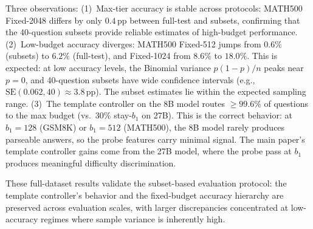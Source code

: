 Three observations:
(1)~Max-tier accuracy is stable across protocols: MATH500 Fixed-2048 differs by only $0.4$\,pp between full-test and subsets, confirming that the 40-question subsets provide reliable estimates of high-budget performance.
(2)~Low-budget accuracy diverges: MATH500 Fixed-512 jumps from $0.6\%$ (subsets) to $6.2\%$ (full-test), and Fixed-1024 from $8.6\%$ to $18.0\%$.
This is expected: at low accuracy levels, the Binomial variance $p(1{-}p)/n$ peaks near $p{=}0$, and 40-question subsets have wide confidence intervals (e.g., $\text{SE}(0.062, 40) \approx 3.8$\,pp).
The subset estimates lie within the expected sampling range.
(3)~The template controller on the 8B model routes $\geq\!99.6\%$ of questions to the max budget (vs.\ $30\%$ stay-$b_1$ on 27B).
This is the correct behavior: at $b_1{=}128$ (GSM8K) or $b_1{=}512$ (MATH500), the 8B model rarely produces parseable answers, so the probe features carry minimal signal.
The main paper's template controller gains come from the 27B model, where the probe pass at $b_1$ produces meaningful difficulty discrimination.

These full-dataset results validate the subset-based evaluation protocol:
the template controller's behavior and the fixed-budget accuracy hierarchy are preserved across evaluation scales, with larger discrepancies concentrated at low-accuracy regimes where sample variance is inherently high.
